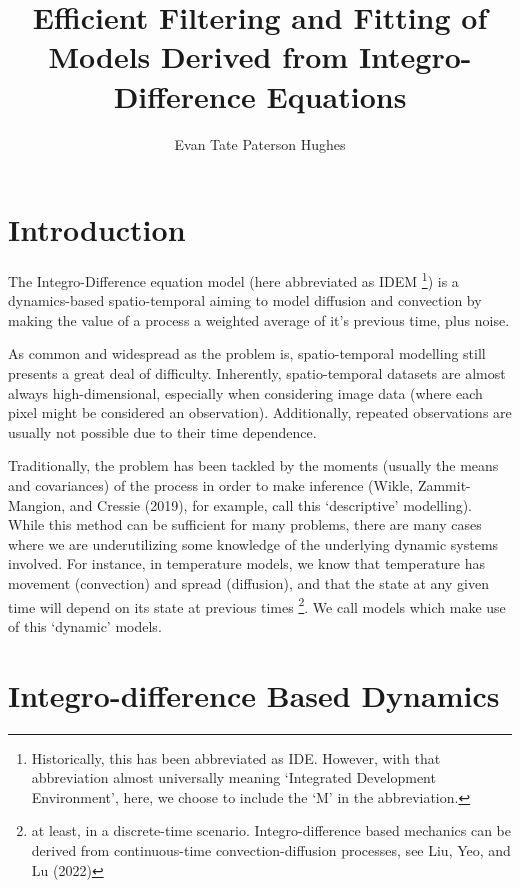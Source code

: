 \documentclass[
]{report}
\title{Efficient Filtering and Fitting of Models Derived from
Integro-Difference Equations}
\author{Evan Tate Paterson Hughes}
\date{}
\renewcommand*\contentsname{Table of contents}
\newcommand\contentsname{Table of contents}
\theoremstyle{plain}
\theoremstyle{plain}
\theoremstyle{remark}
\begin{document}
\maketitle

\renewcommand*\contentsname{Table of contents}
{
\hypersetup{linkcolor=}
\setcounter{tocdepth}{2}
\tableofcontents
}

\chapter{Introduction}\label{introduction}

The Integro-Difference equation model (here abbreviated as IDEM
\footnote{Historically, this has been abbreviated as IDE. However, with
  that abbreviation almost universally meaning `Integrated Development
  Environment', here, we choose to include the `M' in the abbreviation.})
is a dynamics-based spatio-temporal aiming to model diffusion and
convection by making the value of a process a weighted average of it's
previous time, plus noise.

As common and widespread as the problem is, spatio-temporal modelling
still presents a great deal of difficulty. Inherently, spatio-temporal
datasets are almost always high-dimensional, especially when considering
image data (where each pixel might be considered an observation).
Additionally, repeated observations are usually not possible due to
their time dependence.

Traditionally, the problem has been tackled by the moments (usually the
means and covariances) of the process in order to make inference (Wikle,
Zammit-Mangion, and Cressie (2019), for example, call this `descriptive'
modelling). While this method can be sufficient for many problems, there
are many cases where we are underutilizing some knowledge of the
underlying dynamic systems involved. For instance, in temperature
models, we know that temperature has movement (convection) and spread
(diffusion), and that the state at any given time will depend on its
state at previous times \footnote{at least, in a discrete-time scenario.
  Integro-difference based mechanics can be derived from continuous-time
  convection-diffusion processes, see Liu, Yeo, and Lu (2022)}. We call
models which make use of this `dynamic' models.

\chapter{Integro-difference Based
Dynamics}\label{integro-difference-based-dynamics}
\end{document}

